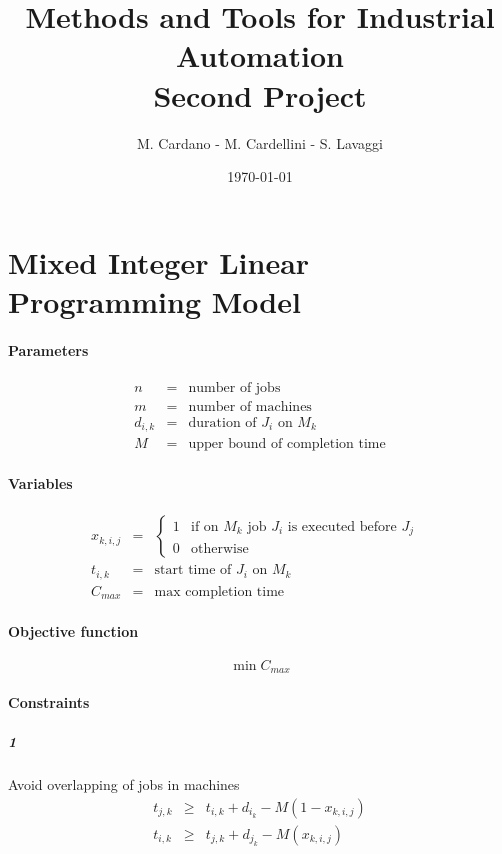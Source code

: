 \documentclass{article}
\title{Methods and Tools for Industrial Automation \\ Second Project}
\author{M. Cardano - M. Cardellini - S. Lavaggi}
\date{\today}
\begin{document}
\maketitle


\section{Mixed Integer Linear Programming Model}

\paragraph{Parameters}
\begin{eqnarray*}
	n &=& \text{number of jobs} \\
	m &=& \text{number of machines} \\
	d_{i,k} & = & \text{duration of $J_i$  on $M_k$} \\
	M &=& \text{upper bound of completion time}
\end{eqnarray*}
\paragraph{Variables}
\begin{eqnarray*}
	x_{k,i,j} & = & 
	\begin{cases}
		1 & \text{if on  $M_k$ job $J_i$ is executed before $J_j$ } \\
		0 & \text{otherwise}
	\end{cases} \\
	t_{i,k} & = & \text{start time of $J_i$ on $M_k$} \\
	C_{max} & = & \text{max completion time}
\end{eqnarray*}
\paragraph{Objective function}
\begin{equation*}
	\min{C_{max}}
\end{equation*}
\paragraph{Constraints}
\subparagraph{1} Avoid overlapping of jobs in machines
\begin{eqnarray*}
t_{j,k} &\geq& t_{i,k} + d_{i_k} - M(1 - x_{k,i,j})  \\
t_{i,k} &\geq& t_{j,k} + d_{j_k} - M(x_{k,i,j})  
\end{eqnarray*}
\end{document}
